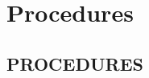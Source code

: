 \part{Procedures}

\chapter{PROCEDURES}
\localtableofcontents
\cleardoublepage





\cleardoublepage